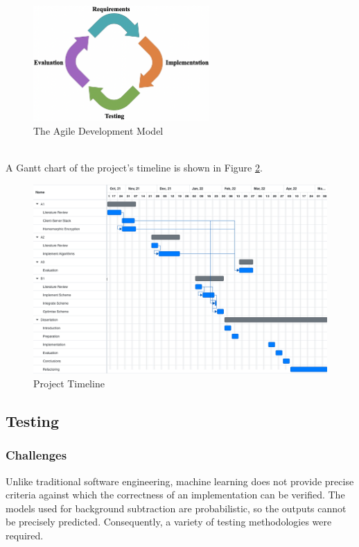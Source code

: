 \begin{figure}[ht]
    \centering
    \includegraphics[width=0.6\textwidth]{figures/agile.png}
    \caption{The Agile Development Model}
    \label{fig:agile}
\end{figure}
\\ \indent
A Gantt chart of the project's timeline is shown in Figure \ref{fig:gantt}.
\begin{figure}[H]
    \centering
    \includegraphics[width=1\textwidth]{figures/gantt.png}
    \caption{Project Timeline}
    \label{fig:gantt}
\end{figure}


\setlength{\leftskip}{0cm}

\subsection{Testing}
\subsubsection{Challenges}
\setlength{\leftskip}{0.5cm}
\indent \indent
Unlike traditional software engineering, machine learning does not provide precise criteria against which the correctness of an implementation can be verified. The models used for background subtraction are probabilistic, so the outputs cannot be precisely predicted.  Consequently, a variety of testing methodologies were required.

